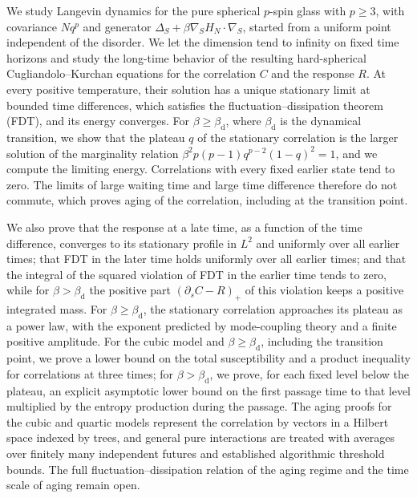 We study Langevin dynamics for the pure spherical $p$-spin glass with $p\ge3$, with covariance $Nq^p$ and generator $\Delta_S+\beta\nabla_SH_N\cdot\nabla_S$, started from a uniform point independent of the disorder. We let the dimension tend to infinity on fixed time horizons and study the long-time behavior of the resulting hard-spherical Cugliandolo--Kurchan equations for the correlation $C$ and the response $R$. At every positive temperature, their solution has a unique stationary limit at bounded time differences, which satisfies the fluctuation--dissipation theorem (FDT), and its energy converges. For $\beta\ge\beta_{\mathrm d}$, where $\beta_{\mathrm d}$ is the dynamical transition, we show that the plateau $q$ of the stationary correlation is the larger solution of the marginality relation $\beta^2p(p-1)q^{p-2}(1-q)^2=1$, and we compute the limiting energy. Correlations with every fixed earlier state tend to zero. The limits of large waiting time and large time difference therefore do not commute, which proves aging of the correlation, including at the transition point.

We also prove that the response at a late time, as a function of the time difference, converges to its stationary profile in $L^2$ and uniformly over all earlier times; that FDT in the later time holds uniformly over all earlier times; and that the integral of the squared violation of FDT in the earlier time tends to zero, while for $\beta>\beta_{\mathrm d}$ the positive part $(\partial_sC-R)_+$ of this violation keeps a positive integrated mass. For $\beta\ge\beta_{\mathrm d}$, the stationary correlation approaches its plateau as a power law, with the exponent predicted by mode-coupling theory and a finite positive amplitude. For the cubic model and $\beta\ge\beta_{\mathrm d}$, including the transition point, we prove a lower bound on the total susceptibility and a product inequality for correlations at three times; for $\beta>\beta_{\mathrm d}$, we prove, for each fixed level below the plateau, an explicit asymptotic lower bound on the first passage time to that level multiplied by the entropy production during the passage. The aging proofs for the cubic and quartic models represent the correlation by vectors in a Hilbert space indexed by trees, and general pure interactions are treated with averages over finitely many independent futures and established algorithmic threshold bounds. The full fluctuation--dissipation relation of the aging regime and the time scale of aging remain open.
